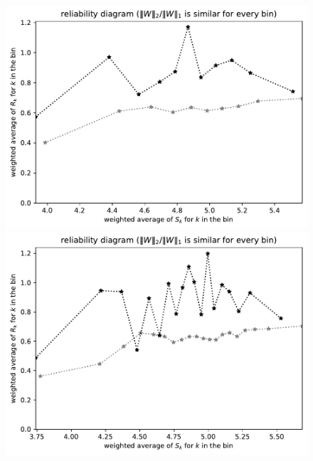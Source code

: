 \documentclass{article}
\begin{document}
\begin{figure}
\begin{centering}
\parbox{\imsize}{\includegraphics[width=\imsize]
{./codes/weighted/County_of_San_Joaquin-NRC/equierrs10}}
\quad\quad
\parbox{\imsize}{\includegraphics[width=\imsize]
{./codes/weighted/County_of_San_Joaquin-NRC/equierrs20}}

\vspace{\vertsep}


\end{centering}
\end{figure}
\end{document}
